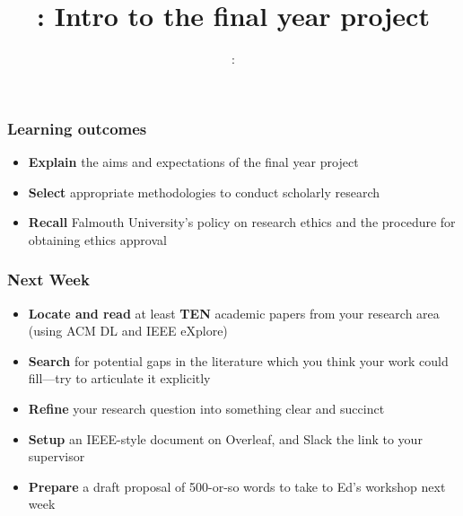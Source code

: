 \usepackage{../../beamerthemeFalmouthGamesAcademy}
\usepackage{multimedia}
\graphicspath{ {../../} }


\usepackage[normalem]{ulem}
\usepackage{wasysym}

\usepackage{algpseudocode}

\usepackage{pdfpages}

\usepackage{fancyvrb}

\usetikzlibrary{arrows,automata}




\title{\sessionnumber: Intro to the final year project}
\subtitle{\modulecode: \moduletitle}

\frame{\titlepage} 

\begin{frame}
	\frametitle{Learning outcomes}
	\begin{itemize}
		\item \textbf{Explain} the aims and expectations of the final year project
		\item \textbf{Select} appropriate methodologies to conduct scholarly research
		\item \textbf{Recall} Falmouth University's policy on research ethics and the procedure for obtaining ethics approval
	\end{itemize}
\end{frame}





\begin{frame}
	\frametitle{Next Week}
	\begin{itemize}
		\item \textbf{Locate and read}  at least \textbf{TEN} academic papers from your research area (using ACM DL and IEEE eXplore)
		\item \textbf{Search} for potential gaps in the literature which you think your work could fill---try to articulate it explicitly
		\item \textbf{Refine} your research question into something clear and succinct
		\item \textbf{Setup} an IEEE-style document on Overleaf, and Slack the link to your supervisor
		\item \textbf{Prepare} a draft proposal of 500-or-so words to take to Ed's workshop next week	
	\end{itemize}
\end{frame}


